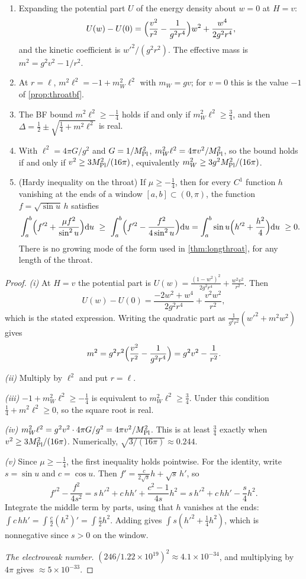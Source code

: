 \begin{theorem}\label{thm:higgsbf}\ver\
\begin{enumerate}[label=(\roman*)]
\item Expanding the potential part $U$ of the energy density about $w=0$ at $H=v$:
\[
U(w)-U(0)=\Bigl(\frac{v^2}{r^2}-\frac1{g^2r^4}\Bigr)w^2+\frac{w^4}{2g^2r^4},
\]
and the kinetic coefficient is $w'^2/(g^2r^2)$. The effective mass is $m^2=g^2v^2-1/r^2$.
\item At $r=\ell$, $m^2\ell^2=-1+m_W^2\ell^2$ with $m_W=gv$; for $v=0$ this is the value $-1$ of \cref{prop:throatbf}.
\item The BF bound $m^2\ell^2\ge-\frac14$ holds if and only if $m_W^2\ell^2\ge\frac34$, and then $\Delta=\frac12\pm\sqrt{\frac14+m^2\ell^2}$ is real.
\item With $\ell^2=4\pi G/g^2$ and $G=1/M_{\rm Pl}^2$, $m_W^2\ell^2=4\pi v^2/M_{\rm Pl}^2$, so the bound holds if and only if $v^2\ge3M_{\rm Pl}^2/(16\pi)$, equivalently $m_W^2\ge3g^2M_{\rm Pl}^2/(16\pi)$.
\item (Hardy inequality on the throat) If $\mu\ge-\frac14$, then for every $C^1$ function $h$ vanishing at the ends of a window $[a,b]\subset(0,\pi)$, the function $f=\sqrt{\sin u}\,h$ satisfies
\[
\int_a^b\Bigl(f'^2+\frac{\mu f^2}{\sin^2u}\Bigr)\dd u\ \ge\ \int_a^b\Bigl(f'^2-\frac{f^2}{4\sin^2u}\Bigr)\dd u=\int_a^b\sin u\Bigl(h'^2+\frac{h^2}4\Bigr)\dd u\ \ge0 .
\]
There is no growing mode of the form used in \cref{thm:longthroat}, for any length of the throat.
\end{enumerate}
\end{theorem}
\begin{proof}
\emph{(i)} At $H=v$ the potential part is $U(w)=\frac{(1-w^2)^2}{2g^2r^4}+\frac{w^2v^2}{r^2}$. Then
\[
U(w)-U(0)=\frac{-2w^2+w^4}{2g^2r^4}+\frac{v^2w^2}{r^2},
\]
which is the stated expression. Writing the quadratic part as $\frac1{g^2r^2}(w'^2+m^2w^2)$ gives
\[
m^2=g^2r^2\Bigl(\frac{v^2}{r^2}-\frac1{g^2r^4}\Bigr)=g^2v^2-\frac1{r^2}.
\]

\emph{(ii)} Multiply by $\ell^2$ and put $r=\ell$.

\emph{(iii)} $-1+m_W^2\ell^2\ge-\frac14$ is equivalent to $m_W^2\ell^2\ge\frac34$. Under this condition $\frac14+m^2\ell^2\ge0$, so the square root is real.

\emph{(iv)} $m_W^2\ell^2=g^2v^2\cdot4\pi G/g^2=4\pi v^2/M_{\rm Pl}^2$. This is at least $\frac34$ exactly when $v^2\ge3M_{\rm Pl}^2/(16\pi)$. Numerically, $\sqrt{3/(16\pi)}\approx0.244$.

\emph{(v)} Since $\mu\ge-\frac14$, the first inequality holds pointwise. For the identity, write $s=\sin u$ and $c=\cos u$. Then $f'=\frac c{2\sqrt s}h+\sqrt s\,h'$, so
\[
f'^2-\frac{f^2}{4s^2}=s\,h'^2+c\,hh'+\frac{c^2-1}{4s}h^2=s\,h'^2+c\,hh'-\frac s4h^2 .
\]
Integrate the middle term by parts, using that $h$ vanishes at the ends: $\int c\,hh'=\int\frac c2(h^2)'=\int\frac s2h^2$. Adding gives $\int s(h'^2+\frac14h^2)$, which is nonnegative since $s>0$ on the window.

\emph{The electroweak number.} $(246/1.22\times10^{19})^2\approx4.1\times10^{-34}$, and multiplying by $4\pi$ gives $\approx5\times10^{-33}$.
\end{proof}


